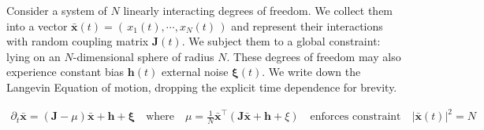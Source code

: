 Consider a system of $N$ linearly interacting degrees of freedom. We collect them into a vector $\mathbf{\bar x}(t) = \left(\,x_1(t),\cdots, x_N(t)\,\right)$ and represent their interactions with random coupling matrix $\mathbf{J}(t)$. We subject them to a global constraint: lying on an $N$-dimensional sphere of radius $N$. These degrees of freedom may also experience constant bias $\mathbf{h}(t)$ external noise $\boldsymbol\xi(t)$. We write down the Langevin Equation of motion, dropping the explicit time dependence for brevity.

\begin{align}

\partial_t\mathbf{\bar x} = (\mathbf{J}-\mu)\mathbf{\bar x}+\mathbf{h}+\boldsymbol\xi\quad
\text{where}\quad\mu = \frac{1}{N}\mathbf{\bar x}^{\top}\left(\mathbf{J}\mathbf{\bar x}+\mathbf{h}+\xi\right)\quad\text{enforces constraint}\quad|\mathbf{\bar x}(t)|^2=N

\end{align}
